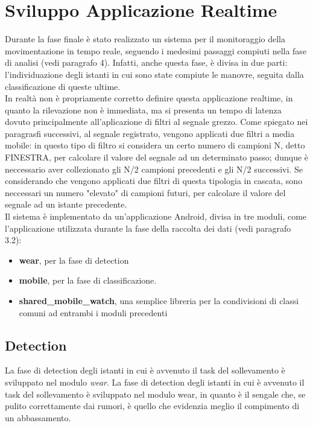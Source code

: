 \documentclass[a4paper, oneside]{book}
\begin{document}
\chapter{Sviluppo Applicazione Realtime}
Durante la fase finale è stato realizzato un sistema per il monitoraggio della movimentazione in tempo reale, seguendo i medesimi passaggi compiuti nella fase di analisi (vedi paragrafo 4). Infatti, anche questa fase, è divisa in due parti: l'individuazione degli istanti in cui sono state compiute le manovre, seguita dalla classificazione di queste ultime.\\
In realtà non è propriamente corretto definire questa applicazione realtime, in quanto la rilevazione non è immediata, ma si presenta un tempo di latenza dovuto principalmente all'aplicazione di filtri al segnale grezzo. Come spiegato nei paragrasfi successivi, al segnale registrato, vengono applicati due filtri a media mobile: in questo tipo di filtro si considera un certo numero di campioni N, detto FINESTRA, per calcolare il valore del segnale ad un determinato passo; dunque è neccessario aver collezionato gli N/2 campioni precedenti e gli N/2 successivi. Se considerando che vengono applicati due filtri di questa tipologia in cascata, sono neccessari un numero "elevato" di campioni futuri, per calcolare il valore del segnale ad un istante precedente.\\
Il sistema è implementato da un'applicazione Android, divisa in tre moduli, come l'applicazione utilizzata durante la fase della raccolta dei dati (vedi paragrafo 3.2): 
\begin {itemize}
\item \textbf{wear}, per la fase di detection
\item \textbf{mobile}, per la fase di classificazione.
\item \textbf{shared\_mobile\_watch}, una semplice libreria per la condivisioni di classi comuni ad entrambi i moduli precedenti \\
\end{itemize}


\section{Detection}
La fase di detection degli istanti in cui è avvenuto il task del sollevamento è sviluppato nel modulo \textit{wear}.
La fase di detection degli istanti in cui è avvenuto il task del sollevamento è sviluppato nel modulo wear, in quanto è il sengale che, se pulito correttamente dai rumori, è quello che evidenzia meglio il compimento di un abbassamento. 
\end{document}
